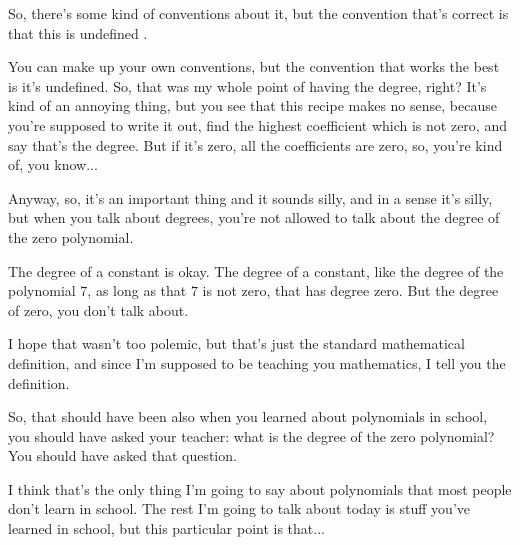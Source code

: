 \begin{speech}[00:24:41 - 00:25:40]
So, there's some kind of conventions about it, but the convention that's correct is that this is undefined .

You can make up your own conventions, but the convention that works the best is it's undefined. So, that was my whole point of having the degree, right? It's kind of an annoying thing, but you see that this recipe makes no sense, because you're supposed to write it out, find the highest coefficient which is not zero, and say that's the degree. But if it's zero, all the coefficients are zero, so, you're kind of, you know...

Anyway, so, it's an important thing and it sounds silly, and in a sense it's silly, but when you talk about degrees, you're not allowed to talk about the degree of the zero polynomial.

The degree of a constant is okay. The degree of a constant, like the degree of the polynomial $7$, as long as that $7$ is not zero, that has degree zero. But the degree of zero, you don't talk about.
\end{speech}

\begin{speech}[00:25:40 - 00:26:17]
I hope that wasn't too polemic, but that's just the standard mathematical definition, and since I'm supposed to be teaching you mathematics, I tell you the definition.

So, that should have been also when you learned about polynomials in school, you should have asked your teacher: what is the degree of the zero polynomial? You should have asked that question. 

I think that's the only thing I'm going to say about polynomials that most people don't learn in school. The rest I'm going to talk about today is stuff you've learned in school, but this particular point is that...
\end{speech}

\begin{content}
\end{content}

